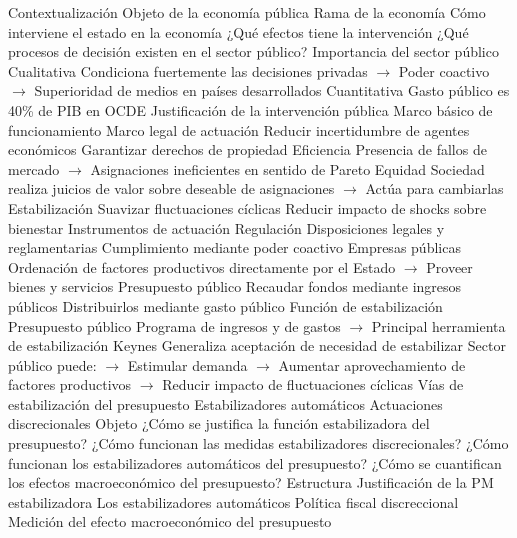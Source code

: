\documentclass{nuevotema}
\begin{document}
\begin{esquemal}
	\1[] 
		\2 Contextualización
			\3 Objeto de la economía pública
				\4 Rama de la economía
				\4[$\to$] Cómo interviene el estado en la economía
				\4[$\to$] ¿Qué efectos tiene la intervención
				\4[$\to$] ¿Qué procesos de decisión existen en el sector público?
			\3 Importancia del sector público
				\4 Cualitativa
				\4[] Condiciona fuertemente las decisiones privadas
				\4[] $\to$ Poder coactivo
				\4[] $\to$ Superioridad de medios en países desarrollados
				\4 Cuantitativa
				\4[] Gasto público es 40\% de PIB en OCDE
			\3 Justificación de la intervención pública
				\4 Marco básico de funcionamiento
				\4[] Marco legal de actuación
				\4[] Reducir incertidumbre de agentes económicos
				\4[] Garantizar derechos de propiedad
				\4 Eficiencia
				\4[] Presencia de fallos de mercado
				\4[] $\to$ Asignaciones ineficientes en sentido de Pareto
				\4 Equidad
				\4[] Sociedad realiza juicios de valor
				\4[] sobre deseable de asignaciones
				\4[] $\to$ Actúa para cambiarlas
				\4 Estabilización
				\4[] Suavizar fluctuaciones cíclicas
				\4[] Reducir impacto de shocks sobre bienestar
			\3 Instrumentos de actuación
				\4 Regulación
				\4[] Disposiciones legales y reglamentarias
				\4[] Cumplimiento mediante poder coactivo
				\4 Empresas públicas
				\4[] Ordenación de factores productivos
				\4[] directamente por el Estado
				\4[] $\to$ Proveer bienes y servicios
				\4 Presupuesto público
				\4[] Recaudar fondos mediante ingresos públicos
				\4[] Distribuirlos mediante gasto público
			\3 Función de estabilización
				\4 Presupuesto público
				\4[] Programa de ingresos y de gastos
				\4[] $\to$ Principal herramienta de estabilización
				\4 Keynes
				\4[] Generaliza aceptación de necesidad de estabilizar
				\4[] Sector público puede:
				\4[] $\to$ Estimular demanda
				\4[] $\to$ Aumentar aprovechamiento de factores productivos
				\4[] $\to$ Reducir impacto de fluctuaciones cíclicas
			\3 Vías de estabilización del presupuesto
				\4 Estabilizadores automáticos
				\4 Actuaciones discrecionales
		\2 Objeto
			\3 ¿Cómo se justifica la función estabilizadora del presupuesto?
			\3 ¿Cómo funcionan las medidas estabilizadores discrecionales?
			\3 ¿Cómo funcionan los estabilizadores automáticos del presupuesto?
			\3 ¿Cómo se cuantifican los efectos macroeconómico del presupuesto?
		\2 Estructura
			\3 Justificación de la PM estabilizadora
			\3 Los estabilizadores automáticos
			\3 Política fiscal discreccional
			\3 Medición del efecto macroeconómico del presupuesto

\end{esquemal}
\end{document}

